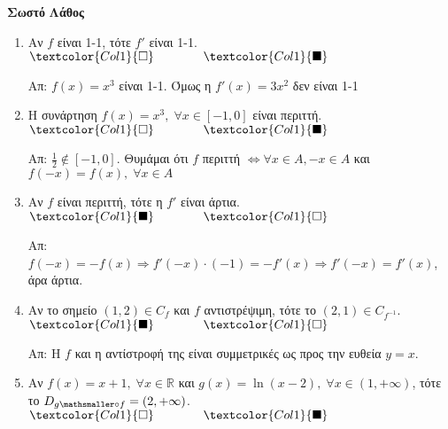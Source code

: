 



\pagestyle{askhseis}




\begin{center}
  \minibox{\large\bfseries \textcolor{Col2}{Συναρτήσεις (Ερωτήσεις)}}
\end{center}


\vspace{\baselineskip}

\hfill \textcolor{Col1}{\textbf{Σωστό}} \quad \textcolor{Col1}{\textbf{Λάθος}}
\begin{enumerate}[itemsep=.5\baselineskip]
  \item \textcolor{Col1}{Αν $f$ είναι 1-1, τότε $ f' $ είναι 1-1}. 
    \hfill $\textcolor{Col1}{\square} \qquad \qquad \textcolor{Col1}{\blacksquare}$

    Απ: $ f(x)=x^{3} $ είναι 1-1. Όμως η $ f'(x) = 3x^{2} $ δεν είναι 1-1

  \item \textcolor{Col1}{Η συνάρτηση $ f(x)=x^{3}, \; \forall x \in [-1,0] $ 
    είναι περιττή}.
    \hfill $\textcolor{Col1}{\square} \qquad \qquad \textcolor{Col1}{\blacksquare}$

    Απ: $ \frac{1}{2} \not\in [-1,0] $. Θυμάμαι ότι $f$ περιττή 
    $ \Leftrightarrow \forall x \in A, -x \in A $ και $ f(-x)=f(x), \; \forall x \in A $ 

  \item \textcolor{Col1}{Αν $f$ είναι περιττή, τότε η $ f' $ είναι άρτια}.
    \hfill $\textcolor{Col1}{\blacksquare} \qquad \qquad \textcolor{Col1}{\square}$

    Απ: $ f(-x)=-f(x) \Rightarrow f'(-x)\cdot (-1) = - f'(x) \Rightarrow f'(-x) = f'(x)
    $, άρα άρτια.

  \item \textcolor{Col1}{Αν το σημείο $ (1,2) \in C_{f} $ και $f$ αντιστρέψιμη, 
    τότε το $ (2,1) \in C_{f^{-1}} $}.
    \hfill $\textcolor{Col1}{\blacksquare} \qquad \qquad \textcolor{Col1}{\square}$

    Απ: Η $f$ και η αντίστροφή της είναι συμμετρικές ως προς την ευθεία $ y=x $.

  \item \textcolor{Col1}{Αν $ f(x)=x+1, \; \forall x \in \mathbb{R} $ και 
      $ g(x)= \ln{(x-2)}, \; \forall x \in (1, + \infty) $, τότε το 
    $ D_{g \mathsmaller\circ f} = (2, + \infty) $}.
    \hfill $\textcolor{Col1}{\square} \qquad \qquad \textcolor{Col1}{\blacksquare}$


\end{enumerate}
